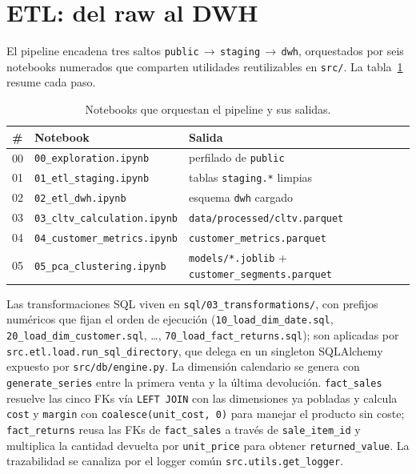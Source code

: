 \section{ETL: del raw al DWH}
\label{sec:etl}

El pipeline encadena tres saltos
\texttt{public}\,$\to$\,\texttt{staging}\,$\to$\,\texttt{dwh}, orquestados
por seis notebooks numerados que comparten utilidades reutilizables en
\texttt{src/}. La tabla~\ref{tab:notebooks} resume cada paso.

\begin{table}[H]
\centering
\caption{Notebooks que orquestan el pipeline y sus salidas.}
\label{tab:notebooks}
\small
\begin{tabular}{l l l}
\toprule
\textbf{\#} & \textbf{Notebook} & \textbf{Salida} \\
\midrule
00 & \texttt{00\_exploration.ipynb}      & perfilado de \texttt{public} \\
01 & \texttt{01\_etl\_staging.ipynb}     & tablas \texttt{staging.*} limpias \\
02 & \texttt{02\_etl\_dwh.ipynb}         & esquema \texttt{dwh} cargado \\
03 & \texttt{03\_cltv\_calculation.ipynb} & \texttt{data/processed/cltv.parquet} \\
04 & \texttt{04\_customer\_metrics.ipynb} & \texttt{customer\_metrics.parquet} \\
05 & \texttt{05\_pca\_clustering.ipynb}  & \texttt{models/*.joblib} + \texttt{customer\_segments.parquet} \\
\bottomrule
\end{tabular}
\end{table}

Las transformaciones SQL viven en \texttt{sql/03\_transformations/}, con
prefijos numéricos que fijan el orden de ejecución
(\texttt{10\_load\_dim\_date.sql},\allowbreak{}
\texttt{20\_load\_dim\_customer.sql},\allowbreak{} \dots,
\texttt{70\_load\_fact\_returns.sql}); son aplicadas por
\texttt{src.etl.load.run\_sql\_directory}, que delega en un singleton
SQLAlchemy expuesto por \texttt{src/db/engine.py}. La dimensión
calendario se genera con \texttt{generate\_series} entre la primera
venta y la última devolución. \texttt{fact\_sales} resuelve las cinco FKs
vía \texttt{LEFT JOIN} con las dimensiones ya pobladas y calcula
\texttt{cost} y \texttt{margin} con \texttt{coalesce(unit\_cost,\,0)} para
manejar el producto sin coste; \texttt{fact\_returns} reusa las FKs de
\texttt{fact\_sales} a través de \texttt{sale\_item\_id} y multiplica la
cantidad devuelta por \texttt{unit\_price} para obtener
\texttt{returned\_value}. La trazabilidad se canaliza por el logger común
\texttt{src.utils.get\_logger}.

